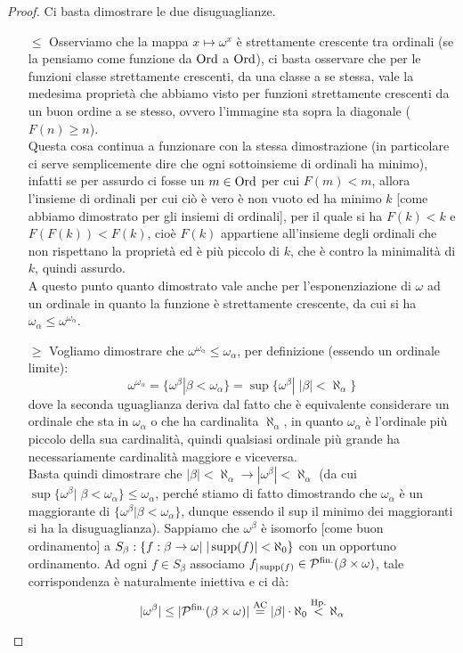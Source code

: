 \begin{proof}
	Ci basta dimostrare le due disuguaglianze.
	\begin{itemize}
		\item[$\boxed{\leq}$] Osserviamo che la mappa $x \mapsto \omega^x$ è strettamente crescente tra ordinali (se la pensiamo come funzione da $\operatorname{Ord}$ a $\operatorname{Ord}$), ci basta osservare che per le funzioni classe strettamente crescenti, da una classe a se stessa, vale la medesima proprietà che abbiamo visto per funzioni strettamente crescenti da un buon ordine a se stesso, ovvero l'immagine sta sopra la diagonale ($F(n) \geq n$).\\
		Questa cosa continua a funzionare con la stessa dimostrazione (in particolare ci serve semplicemente dire che ogni sottoinsieme di ordinali ha minimo), infatti se per assurdo ci fosse un $m \in \operatorname{Ord}$ per cui $F(m) < m$, allora l'insieme di ordinali per cui ciò è vero è non vuoto ed ha minimo $k$ [come abbiamo dimostrato per gli insiemi di ordinali], per il quale si ha $F(k) < k$ e $F(F(k)) < F(k)$, cioè $F(k)$ appartiene all'insieme degli ordinali che non rispettano la 
		proprietà ed è più piccolo di $k$, che è contro la minimalità di $k$, quindi assurdo.\\
		A questo punto quanto dimostrato vale anche per l'esponenziazione di $\omega$ ad un ordinale in quanto la funzione è strettamente crescente, da cui si ha $\omega_\alpha \leq \omega^{\omega_\alpha}$.
		\item[$\boxed{\geq}$] Vogliamo dimostrare che $\omega^{\omega_\alpha} \leq \omega_\alpha$, per definizione (essendo un ordinale limite):
		\[ \omega^{\omega_\alpha} = \{\omega^{\beta} | \beta < \omega_\alpha\} = \sup\{\omega^\beta |\;|\beta| < \aleph_\alpha\}
			\]
		dove la seconda uguaglianza deriva dal fatto che è equivalente considerare un ordinale che sta in $\omega_\alpha$ o che ha cardinalita $\aleph_\alpha$, in quanto $\omega_\alpha$ è l'ordinale più piccolo della sua cardinalità, quindi qualsiasi ordinale più grande ha necessariamente cardinalità maggiore e viceversa.\\
		Basta quindi dimostrare che $|\beta| < \aleph_\alpha \rightarrow |\omega^\beta| < \aleph_\alpha$ (da cui $\sup\{\omega^\beta | \; \beta < \omega_\alpha\} \leq \omega_\alpha$, perché stiamo di fatto dimostrando che $\omega_\alpha$ è un maggiorante di $\{\omega^\beta | \beta < \omega_\alpha\}$, dunque essendo il sup il minimo dei maggioranti si ha la disuguaglianza).
		Sappiamo che $\omega^{\beta}$ è isomorfo [come buon ordinamento] a $S_\beta : \{f : \beta \to \omega |\;|\operatorname{supp}(f)|<\aleph_0\}$ con un opportuno ordinamento. Ad ogni $f \in S_\beta$ associamo $f_{|\operatorname{supp}(f)} \in \mathcal{P}^{\text{fin.}}(\beta \times \omega)$, tale corrispondenza è naturalmente iniettiva e ci dà:
		\[ |\omega^{\beta}| \leq |\mathcal{P}^{\text{fin.}}(\beta \times \omega)| \overset{\text{AC}}{=} |\beta| \cdot \aleph_0 \overset{\text{Hp.}}{<} \aleph_\alpha
			\]
	\end{itemize}
\end{proof}

